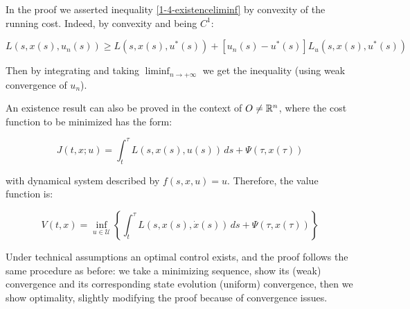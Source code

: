 \begin{remark}\label{1-4-reamrkconvexity}
    In the proof we asserted inequality \ref{1-4-existenceliminf} by convexity of the running cost. Indeed, 
    by convexity and being $C^1$:

    \[L(s,x(s),u_n(s)) \geq L(s,x(s),u^{\ast}(s)) + \left[u_n(s) - u^{\ast}(s)\right]L_u(s,x(s),u^{\ast}(s))\]

    Then by integrating and taking $\liminf_{n\to+\infty}$ we get the inequality (using weak convergence of $u_n$). 
\end{remark}

An existence result can also be proved in the context of $O\neq\mathbb{R}^n$, where the cost function
to be minimized has the form:

\begin{equation}
    J(t,x;u)=\int_t^{\tau} L(s,x(s),u(s)) \,ds + \Psi(\tau,x(\tau))
\end{equation}

with dynamical system described by $f(s,x,u)=u$. Therefore, the value function is:

\begin{equation}
    V(t,x) = \inf_{u\in\mathcal{U}} \left\{\int_t^{\tau} L(s,x(s),\dot{x}(s)) \,ds + \Psi(\tau,x(\tau))\right\}
\end{equation}

Under technical assumptions an optimal control exists, and the proof follows
the same procedure as before: we take a minimizing sequence, show its (weak) convergence
and its corresponding state evolution (uniform) convergence, then we show 
optimality, slightly modifying the proof because of convergence issues.